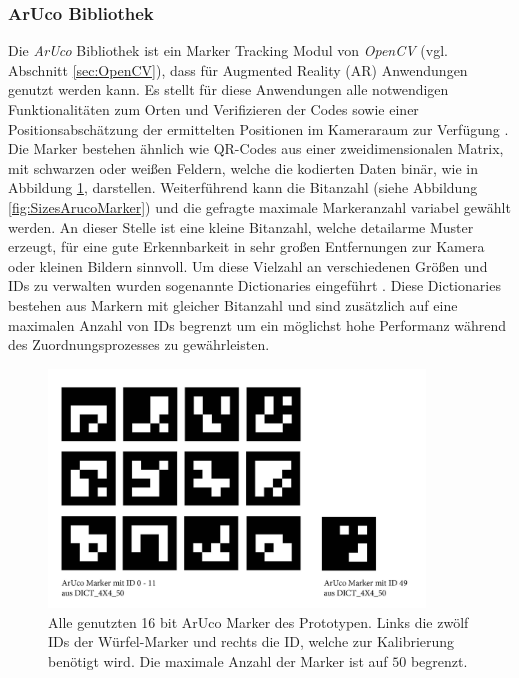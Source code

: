 \subsubsection{ArUco Bibliothek} \label{sec:aruco} 
Die \textit{ArUco} Bibliothek ist ein Marker Tracking Modul von \textit{OpenCV} (vgl. Abschnitt \ref{sec:OpenCV}), dass für Augmented Reality (AR) Anwendungen genutzt werden kann. Es stellt für diese Anwendungen alle notwendigen Funktionalitäten zum Orten und Verifizieren der Codes sowie einer Positionsabschätzung der ermittelten Positionen im Kameraraum zur Verfügung \cite{article:Aruco2014}. 
Die Marker bestehen ähnlich wie QR-Codes aus einer zweidimensionalen Matrix, mit schwarzen oder weißen Feldern, welche die kodierten Daten binär, wie in Abbildung \ref{fig:AllUsedArucoMarker}, darstellen.  Weiterführend kann die Bitanzahl (siehe Abbildung \ref{fig:SizesArucoMarker}) und die gefragte maximale Markeranzahl variabel gewählt werden. An dieser Stelle ist eine kleine Bitanzahl, welche detailarme Muster erzeugt, für eine gute Erkennbarkeit in sehr großen Entfernungen zur Kamera oder kleinen Bildern sinnvoll. Um diese Vielzahl an verschiedenen Größen und IDs zu verwalten wurden sogenannte Dictionaries eingeführt \cite{article:ArucoDictGarridoJurado2015}. Diese Dictionaries bestehen aus Markern mit gleicher Bitanzahl und sind zusätzlich auf eine maximalen Anzahl von IDs begrenzt um ein möglichst hohe Performanz während des Zuordnungsprozesses zu gewährleisten.\\

\begin{figure}[H] 
	\center 
	\includegraphics[width=10cm]{Bilder/Aruco_marker.jpg}			
	\caption{Alle genutzten 16 bit ArUco Marker des Prototypen. Links die zwölf IDs der Würfel-Marker und rechts die ID, welche zur Kalibrierung benötigt wird. Die maximale Anzahl der Marker ist auf $50$ begrenzt.}
	\label{fig:AllUsedArucoMarker}
\end{figure}

